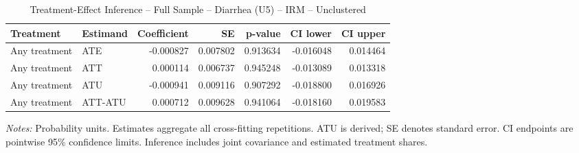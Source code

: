 \begin{table}[htbp]
\centering
\caption{Treatment-Effect Inference -- Full Sample -- Diarrhea (U5) -- IRM -- Unclustered}
\label{tab:inference-diarrhea-IRM-iid}
\scriptsize
\begin{adjustbox}{max width=\linewidth}
\begin{tabular}{llrrrrr}
\toprule
Treatment & Estimand & Coefficient & SE & p-value & CI lower & CI upper \\
\midrule
Any treatment & ATE & -0.000827 & 0.007802 & 0.913634 & -0.016048 & 0.014464 \\
Any treatment & ATT & 0.000114 & 0.006737 & 0.945248 & -0.013089 & 0.013318 \\
Any treatment & ATU & -0.000941 & 0.009116 & 0.907292 & -0.018800 & 0.016926 \\
Any treatment & ATT-ATU & 0.000712 & 0.009628 & 0.941064 & -0.018160 & 0.019583 \\
\bottomrule
\end{tabular}

\end{adjustbox}
\par\smallskip
\begin{minipage}{\linewidth}\scriptsize \textit{Notes:} Probability units. Estimates aggregate all cross-fitting repetitions. ATU is derived; SE denotes standard error. CI endpoints are pointwise 95\% confidence limits. Inference includes joint covariance and estimated treatment shares. \end{minipage}
\end{table}

